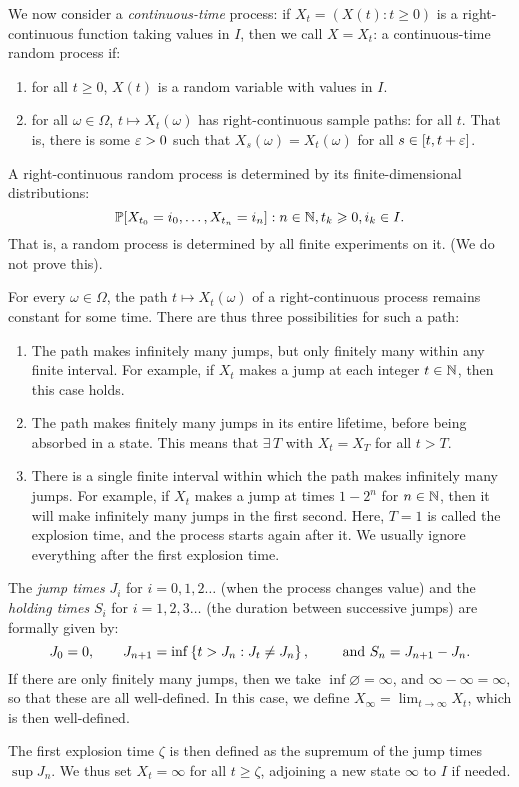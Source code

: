 \documentclass{article}
\begin{document}
\begin{definition}
    We now consider a \textit{continuous-time} process: if $X_t = (X(t): t \geq 0)$ is a right-continuous function taking values in $I$, then we call $X = X_t$: a continuous-time random process if:
	\begin{enumerate}
    	\item for all $t \geq 0$, $X(t)$ is a random variable with values in $I$.
	    \item for all $\omega \in \Omega$, $t \mapsto X_t(\omega)$ has right-continuous sample paths: for all $t$. That is, there is some $\varepsilon > 0$ such that $X_s(\omega) = X_t(\omega)$ for all $s \in [t, t+\varepsilon]$.
	\end{enumerate}
\end{definition}
   A right-continuous random process is determined by its finite-dimensional distributions:
\[
\mathbb{P}[X_{t_0} = i_0, \dots , X_{t_n} = i_n] : n \in \mathbb{N}, t_k \geqslant 0, i_k \in I.
\]
That is, a random process is determined by all finite experiments on it. (We do not prove this).

For every $\omega \in \Omega$, the path $t \mapsto X_t(\omega)$ of a right-continuous process remains constant for some time. There are thus three possibilities for such a path:
\begin{enumerate}
    \item The path makes infinitely many jumps, but only finitely many within any finite interval. For example, if $X_t$ makes a jump at each integer $t \in \mathbb{N}$, then this case holds.
    \item The path makes finitely many jumps in its entire lifetime, before being absorbed in a state. This means that $\exists \, T$ with $X_t = X_T$ for all $t > T$.
    \item There is a single finite interval within which the path makes infinitely many jumps. For example, if $X_t$ makes a jump at times $1 - 2^n$ for $n \in \mathbb{N}$, then it will make infinitely many jumps in the first second. Here, $T=1$ is called the explosion time, and the process starts again after it. We usually ignore everything after the first explosion time.
\end{enumerate}

\begin{definition}
    The \textit{jump times} $J_i$ for $i = 0, 1, 2 \dots$ (when the process changes value) and the \textit{holding times} $S_i$ for $i = 1, 2, 3 \dots$ (the duration between successive jumps) are formally given by:
	\[
	J_0 = 0, \qquad J_{n+1} = \inf \left\lbrace t > J_n : J_t \neq J_n \right\rbrace, \qquad \text{ and } S_n = J_{n+1} - J_n.
	\]
If there are only finitely many jumps, then we take $\inf \varnothing = \infty$, and $\infty - \infty = \infty$, so that these are all well-defined. In this case, we define $X_\infty = \lim_{t \to \infty} X_t$, which is then well-defined.

The first explosion time $\zeta$ is then defined as the supremum of the jump times $\sup J_n$. We thus set $X_t = \infty$ for all $t \geq \zeta$, adjoining a new state $\infty$ to $I$ if needed.
\end{definition}
\end{document}
